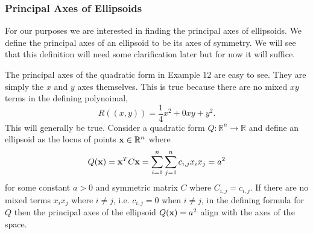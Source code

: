 \documentclass{book}
\begin{document}
\subsubsection{Principal Axes of Ellipsoids}

For our purposes we are interested in finding the principal axes of ellipsoids. We define the principal axes of an ellipsoid to be its axes of symmetry. We will see that this definition will need some clarification later but for now it will suffice. 

The principal axes of the quadratic form in Example 12 are easy to see. They are simply the $x$ and $y$ axes themselves. This is true because there are no mixed $xy$ terms in the defining polynoimal,
$$
R((x,y))=\frac{1}{4}x^2+0xy+y^2.
$$
This will generally be true. Consider a quadratic form $Q:\mathbb{R}^n\rightarrow\mathbb{R}$ and define an ellipsoid as the locus of points ${\bf x}\in\mathbb{R}^n$ where
$$
Q({\bf x})={\bf x}^TC{\bf x}=\sum_{i=1}^{n} \sum_{j =1}^{n}c_{i,j} x_ix_j=a^2
$$
for some constant $a>0$ and symmetric matrix $C$ where $C_{i,j}=c_{i,j}$. If there are no mixed terms $x_ix_j$ where $i \neq j$, i.e. $c_{i,j}=0$ when $i \neq j$, in the defining formula for $Q$ then the principal axes of the ellipsoid $Q({\bf x})=a^2$ align with the axes of the space. 
\end{document}
